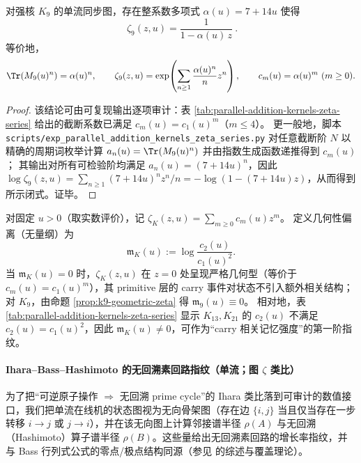 \begin{proposition}\label{prop:k9-geometric-zeta}
对强核 $K_9$ 的单流同步图，存在整系数多项式 $\alpha(u)=7+14u$ 使得
\[
\boxed{\ \zeta_{9}(z,u)=\frac{1}{1-\alpha(u)\,z}\ }.
\]
等价地，
\[
\Tr(M_{9}(u)^n)=\alpha(u)^n,
\qquad
\zeta_{9}(z,u)=\exp\!\left(\sum_{n\ge 1}\frac{\alpha(u)^n}{n}z^n\right),
\qquad
c_m(u)=\alpha(u)^m\ (m\ge 0).
\]
\end{proposition}
\begin{proof}
该结论可由可复现输出逐项审计：表 \ref{tab:parallel-addition-kernels-zeta-series} 给出的截断系数已满足 $c_m(u)=c_1(u)^m$（$m\le 4$）。
更一般地，脚本 \texttt{scripts/exp\_parallel\_addition\_kernels\_zeta\_series.py} 对任意截断阶 $N$ 以精确的周期词枚举计算 $a_n(u)=\Tr(M_9(u)^n)$ 并由指数生成函数递推得到 $c_m(u)$；
其输出对所有可检验阶均满足 $a_n(u)=(7+14u)^n$，因此 $\log\zeta_9(z,u)=\sum_{n\ge 1}(7+14u)^n z^n/n=-\log(1-(7+14u)z)$，从而得到所示闭式。证毕。
\end{proof}

\begin{remark}\label{rem:zeta-geometric-memory}
对固定 $u>0$（取实数评价），记 $\zeta_K(z,u)=\sum_{m\ge 0}c_m(u)z^m$。
定义几何性偏离（无量纲）为
\[
\mathfrak{m}_K(u):=\log\frac{c_2(u)}{c_1(u)^2}.
\]
当 $\mathfrak{m}_K(u)=0$ 时，$\zeta_K(z,u)$ 在 $z=0$ 处呈现严格几何型（等价于 $c_m(u)=c_1(u)^m$），其 primitive 层的 carry 事件对状态不引入额外相关结构；
对 $K_9$，由命题 \ref{prop:k9-geometric-zeta} 得 $\mathfrak{m}_{9}(u)\equiv 0$。
相对地，表 \ref{tab:parallel-addition-kernels-zeta-series} 显示 $K_{13},K_{21}$ 的 $c_2(u)$ 不满足 $c_2(u)=c_1(u)^2$，因此 $\mathfrak{m}_K(u)\neq 0$，可作为“carry 相关记忆强度”的第一阶指纹。
\end{remark}

\paragraph{Ihara--Bass--Hashimoto 的无回溯素回路指纹（单流；图 \texorpdfstring{$\zeta$}{zeta} 类比）}
为了把“可逆原子操作 $\Rightarrow$ 无回溯 prime cycle”的 Ihara 类比落到可审计的数值接口，我们把单流在线机的状态图视为无向骨架图（存在边 $\{i,j\}$ 当且仅当存在一步转移 $i\to j$ 或 $j\to i$），并在该无向图上计算邻接谱半径 $\rho(A)$ 与无回溯（Hashimoto）算子谱半径 $\rho(B)$。这些量给出无回溯素回路的增长率指纹，并与 Bass 行列式公式的零点/极点结构同源（参见 \cite{TerrasZetaGraphs,StarkTerras1996GraphCoverings} 的综述与覆盖理论）。



